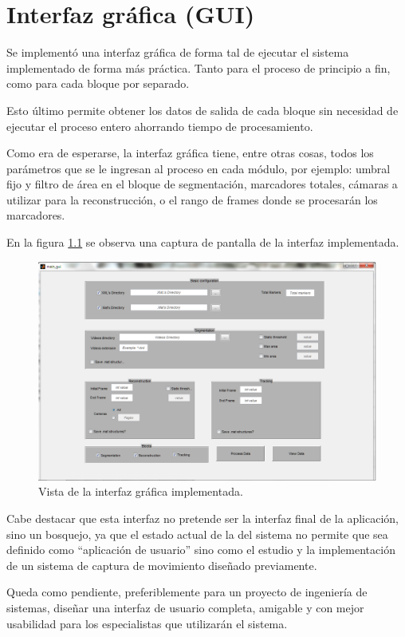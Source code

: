 \chapter{Interfaz gráfica (GUI)}

Se implementó una interfaz gráfica de forma tal de ejecutar el sistema implementado de forma más práctica. Tanto para el proceso de principio a fin, como para cada bloque por separado.

Esto último permite obtener los datos de salida de cada bloque sin necesidad de ejecutar el proceso entero ahorrando tiempo de procesamiento.

Como era de esperarse, la interfaz gráfica tiene, entre otras cosas, todos los parámetros que se le ingresan al proceso en cada módulo, por ejemplo: umbral fijo y filtro de área en el bloque de segmentación, marcadores totales, cámaras a utilizar para la reconstrucción, o el rango de frames donde se procesarán los marcadores.

En la figura \ref{guiVent} se observa una captura de pantalla de la interfaz implementada.

\begin{figure}[H]
\hspace{-1cm}
\includegraphics[scale=0.54]{img/gui.png}
\caption{Vista de la interfaz gráfica implementada.}
\label{guiVent}
\end{figure}

Cabe destacar que esta interfaz no pretende ser la interfaz final de la aplicación, sino un bosquejo, ya que el estado actual de la del sistema no permite que sea definido como ``aplicación de usuario'' sino como el estudio y la implementación de un sistema de captura de movimiento diseñado previamente.

Queda como pendiente, preferiblemente para un proyecto de ingeniería de sistemas, diseñar una interfaz de usuario completa, amigable y con mejor usabilidad para los especialistas que utilizarán el sistema.